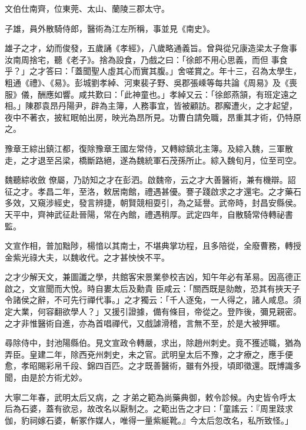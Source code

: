 \begin{pinyinscope}
 文伯仕南齊，位東莞、太山、蘭陵三郡太守。



 子雄，員外散騎侍郎，醫術為江左所稱，事並見《南史》。



 雄子之才，幼而俊發，五歲誦《孝經》，八歲略通義旨。曾與從兄康造梁太子詹事汝南周捨宅，聽《老子》。捨為設食，乃戲之曰：「徐郎不用心思義，而但
 事食乎？」之才答曰：「蓋聞聖人虛其心而實其腹。」舍嗟賞之。年十三，召為太學生，粗通《禮》、《易》。彭城劉孝綽、河東裴子野、吳郡張嵊等每共論《周易》及《喪服》儀，酬應如響。咸共歎曰：「此神童也。」孝綽又云：「徐郎燕頷，有班定遠之相。」陳郡袁昂丹陽尹，辟為主簿，人務事宜，皆被顧訪。郡廨遭火，之才起望，夜中不著衣，披紅眠帕出房，映光為昂所見。功曹白請免職，昂重其才術，仍特原之。



 豫章王綜出鎮江都，復除豫章王國左常侍，又轉綜鎮北主簿。及綜入魏，三軍散走，之才退至呂梁，橋斷路絕，遂為魏統軍石茂孫所止。綜入魏旬月，位至司空。



 魏聽綜收斂
 僚屬，乃訪知之才在彭泗。啟魏帝，云之才大善醫術，兼有機辯。詔征之才。孝昌二年，至洛，敕居南館，禮遇甚優。謇子踐啟求之才還宅。之才藥石多效，又窺涉經史，發言辨捷，朝賢競相耍引，為之延譽。武帝時，封昌安縣侯。天平中，齊神武征赴晉陽，常在內館，禮遇稍厚。武定四年，自散騎常侍轉祕書監。



 文宣作相，普加黜陟，楊愔以其南士，不堪典掌功程，且多陪從，全廢曹務，轉授金紫光祿大夫，以魏收代。之才甚怏怏不平。



 之才少解天文，兼圖讖之學，共館客宋景業參校吉凶，知午年必有革易。因高德正啟之，文宣聞而大悅。時自婁太后及勳貴
 臣咸云：「關西既是勍敵，恐其有挾天子令諸侯之辭，不可先行禪代事。」之才獨云：「千人逐兔，一人得之，諸人咸息。須定大業，何容翻欲學人？」又援引證據，備有條目，帝從之。登阼後，彌見親密。之才非惟醫術自進，亦為首唱禪代，又戲謔滑稽，言無不至，於是大被狎暱。



 尋除侍中，封池陽縣伯。見文宣政令轉嚴，求出，除趙州刺史。竟不獲述職，猶為弄臣。皇建二年，除西兗州刺史，未之官。武明皇太后不豫，之才療之，應手便愈，孝昭賜彩帛千段、錦四百匹。之才既善醫術，雖有外授，頃即徵還。既博識多聞，由是於方術尤妙。



 大寧二年春，武明太后又病，之
 才弟之範為尚藥典御，敕令診候。內史皆令呼太后為石婆，蓋有欲忌，故改名以厭制之。之範出告之才曰：「童謠云：『周里跂求伽，豹祠嫁石婆，斬冢作媒人，唯得一量紫綖靴。』今太后忽改名，私所致怪。」




\end{pinyinscope}
